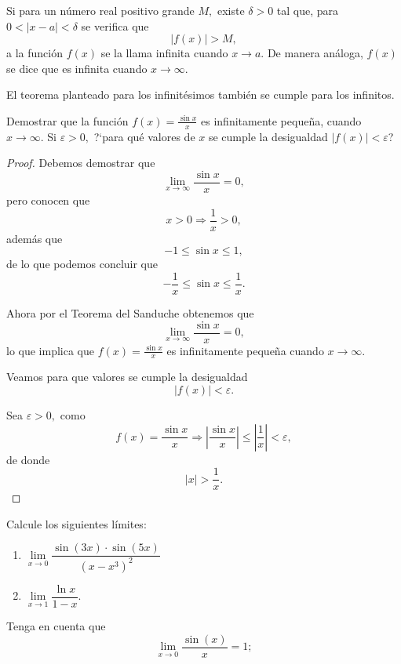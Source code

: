 \begin{definition}[Infinitos]
	Si para un n\'umero	real positivo grande \(M,\) existe \(\delta>0\) tal que, para \(0<\left|x-a\right|<\delta\) se verifica que 
	\[
	\left|f(x)\right|>M,
	\]
	a la funci\'on \(f(x)\) se la llama infinita cuando \(x\to a.\) De manera an\'aloga, \(f(x)\) se dice que es infinita cuando \(x\to \infty.\)
\end{definition}

El teorema planteado para los infinit\'esimos tambi\'en se cumple para los infinitos.

\begin{exercise}
	Demostrar que la funci\'on \(f(x)=\frac{\sin x}{x}\) es infinitamente peque\~na, cuando \(x\to\infty.\)
	Si \(\varepsilon>0,\) ?`para qu\'e valores de \(x\) se cumple la desigualdad \(\left|f(x)\right|<\varepsilon\)?
\end{exercise}

\begin{proof}
	Debemos demostrar que
	\[
	\lim\limits_{x\to\infty}\dfrac{\sin x}{x}=0,
	\]
pero conocen que
\[
x>0\Rightarrow\dfrac{1}{x}>0,
\]
adem\'as que
\[
-1\leq\sin x\leq 1,
\]
de lo que podemos concluir que
\[
-\dfrac{1}{x}\leq\sin x\leq\dfrac{1}{x}.
\]

Ahora por el Teorema del Sanduche obtenemos que
\[
\lim\limits_{x\to\infty}\dfrac{\sin x}{x}=0,
\]
lo que implica que \(f(x)=\frac{\sin x}{x}\) es infinitamente peque\~na cuando \(x\to\infty.\)\newline

Veamos para que valores se cumple la desigualdad 
\[
\left|f(x)\right|<\varepsilon.
\]

Sea \(\varepsilon>0,\) como 
\[
f(x)=\dfrac{\sin x}{x}\Rightarrow\left|\dfrac{\sin x}{x}\right|\leq\left|\dfrac{1}{x}\right|<\varepsilon,
\]
de donde
\[
\left|x\right|>\dfrac{1}{x}.
\]
\end{proof}

\begin{exercise}
	Calcule los siguientes l\'imites:
	\begin{enumerate}
		\item \(\lim\limits_{x\to 0}\dfrac{\sin(3x)\cdot\sin(5x)}{(x-x^3)^2}\)
		\item \(\lim\limits_{x\to 1}\dfrac{\ln x}{1-x}.\)
	\end{enumerate}
\end{exercise}

Tenga en cuenta que
\[
\lim\limits_{x\to 0}\dfrac{\sin(x)}{x}=1;
\]

